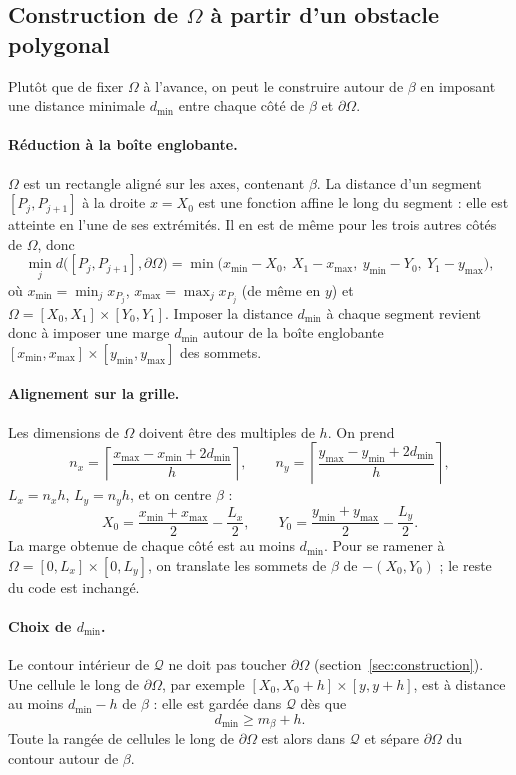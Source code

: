 \documentclass[11pt,a4paper]{article}
\begin{document}
\subsection{Construction de $\Omega$ à partir d'un obstacle polygonal}
\label{sec:omega}

Plutôt que de fixer $\Omega$ à l'avance, on peut le construire autour de
$\beta$ en imposant une distance minimale $d_{\min}$ entre chaque côté de
$\beta$ et $\partial\Omega$.

\paragraph{Réduction à la boîte englobante.} $\Omega$ est un rectangle
aligné sur les axes, contenant $\beta$. La distance d'un segment
$[P_j, P_{j+1}]$ à la droite $x = X_0$ est une fonction affine le long du
segment : elle est atteinte en l'une de ses extrémités. Il en est de même pour
les trois autres côtés de $\Omega$, donc
\[
\min_j d\big([P_j, P_{j+1}], \partial\Omega\big)
= \min\big(x_{\min} - X_0,\ X_1 - x_{\max},\ y_{\min} - Y_0,\ Y_1 - y_{\max}\big),
\]
où $x_{\min} = \min_j x_{P_j}$, $x_{\max} = \max_j x_{P_j}$ (de même en $y$) et
$\Omega = [X_0, X_1] \times [Y_0, Y_1]$. Imposer la distance $d_{\min}$ à
chaque segment revient donc à imposer une marge $d_{\min}$ autour de la boîte
englobante $[x_{\min}, x_{\max}] \times [y_{\min}, y_{\max}]$ des sommets.

\paragraph{Alignement sur la grille.} Les dimensions de $\Omega$ doivent être
des multiples de $h$. On prend
\[
n_x = \left\lceil \frac{x_{\max} - x_{\min} + 2 d_{\min}}{h} \right\rceil,
\qquad
n_y = \left\lceil \frac{y_{\max} - y_{\min} + 2 d_{\min}}{h} \right\rceil,
\]
$L_x = n_x h$, $L_y = n_y h$, et on centre $\beta$ :
\[
X_0 = \frac{x_{\min} + x_{\max}}{2} - \frac{L_x}{2},
\qquad
Y_0 = \frac{y_{\min} + y_{\max}}{2} - \frac{L_y}{2}.
\]
La marge obtenue de chaque côté est au moins $d_{\min}$. Pour se ramener à
$\Omega = [0, L_x] \times [0, L_y]$, on translate les sommets de $\beta$ de
$-(X_0, Y_0)$ ; le reste du code est inchangé.

\paragraph{Choix de $d_{\min}$.} Le contour intérieur de $\mathcal{Q}$ ne
doit pas toucher $\partial\Omega$ (section~\ref{sec:construction}). Une
cellule le long de $\partial\Omega$, par exemple $[X_0, X_0 + h] \times
[y, y + h]$, est à distance au moins $d_{\min} - h$ de $\beta$ : elle est
gardée dans $\mathcal{Q}$ dès que
\[
d_{\min} \ge m_\beta + h .
\]
Toute la rangée de cellules le long de $\partial\Omega$ est alors dans
$\mathcal{Q}$ et sépare $\partial\Omega$ du contour autour de $\beta$.
\end{document}
